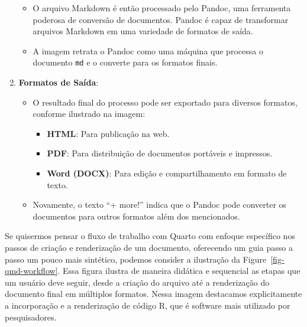 \documentclass[
  a4paper,
]{article}
\providecommand{\tightlist}{%
  \setlength{\itemsep}{0pt}\setlength{\parskip}{0pt}}\usepackage{longtable,booktabs,array}
\begin{document}
\begin{tcolorbox}
\begin{enumerate}
  \begin{itemize}
  \tightlist
  \item
    O arquivo Markdown é então processado pelo Pandoc, uma ferramenta
    poderosa de conversão de documentos. Pandoc é capaz de transformar
    arquivos Markdown em uma variedade de formatos de saída.
  \item
    A imagem retrata o Pandoc como uma máquina que processa o documento
    \texttt{md} e o converte para os formatos finais.
  \end{itemize}
\item
  \textbf{Formatos de Saída}:

  \begin{itemize}
  \tightlist
  \item
    O resultado final do processo pode ser exportado para diversos
    formatos, conforme ilustrado na imagem:

    \begin{itemize}
    \tightlist
    \item
      \textbf{HTML}: Para publicação na web.
    \item
      \textbf{PDF}: Para distribuição de documentos portáveis e
      impressos.
    \item
      \textbf{Word (DOCX)}: Para edição e compartilhamento em formato de
      texto.
    \end{itemize}
  \item
    Novamente, o texto ``+ more!'' indica que o Pandoc pode converter os
    documentos para outros formatos além dos mencionados.
  \end{itemize}
\end{enumerate}

\end{tcolorbox}

Se quisermos pensar o fluxo de trabalho com Quarto com enfoque
específico nos passos de criação e renderização de um documento,
oferecendo um guia passo a passo um pouco mais sintético, podemos
consider a ilustração da Figure~\ref{fig-qmd-workflow}. Essa figura
ilustra de maneira didática e sequencial as etapas que um usuário deve
seguir, desde a criação do arquivo até a renderização do documento final
em múltiplos formatos. Nessa imagem destacamos explicitamente a
incorporação e a renderização de código R, que é software mais utilizado
por pesquisadores.
\end{document}
